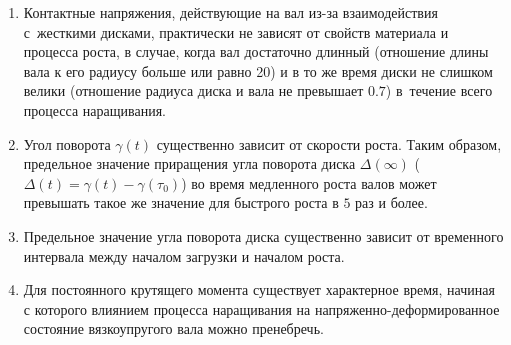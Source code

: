 


\begin{enumerate}



\item[1.] Контактные напряжения, действующие на вал из-за взаимодействия с~жесткими дисками, практически не зависят от свойств материала и процесса роста, в случае, когда вал достаточно длинный (отношение длины вала к его радиусу больше или равно 20) и в то же время диски не слишком велики (отношение радиуса диска и вала не превышает $0.7 $) в~течение всего процесса наращивания.

\item[2.] Угол поворота $\gamma(t)$ существенно зависит от скорости роста. Таким образом, предельное значение приращения угла поворота диска $\Delta(\infty)$ ($\Delta(t)=\gamma(t)-\gamma(\tau_0)$) во время медленного роста валов может превышать такое же значение для быстрого роста в $5$ раз и более.

\item[3.]Предельное значение угла поворота диска существенно зависит от временного интервала между началом загрузки и началом роста.

\item[4.]Для постоянного крутящего момента существует характерное время, начиная с которого влиянием процесса наращивания на напряженно-деформированное состояние вязкоупругого вала можно пренебречь.



\end{enumerate}
















